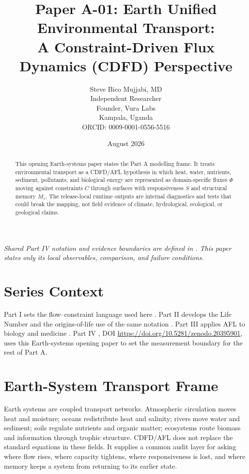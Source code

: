 \documentclass[12pt,a4paper]{article}
\title{\textbf{Paper A-01: Earth Unified Environmental Transport:\\ A Constraint-Driven Flux Dynamics (CDFD) Perspective}}
\author{Steve Bico Mujjabi, MD\\
\small Independent Researcher\\
\small Founder, Vura Labs\\
\small Kampala, Uganda\\
\small ORCID: 0009-0001-0556-5516}
\date{August 2026}
\begin{document}
\maketitle

\noindent\textit{Shared Part IV notation and evidence boundaries are defined in . This paper states only its local observables, comparison, and failure conditions.}

\begin{abstract}
This opening Earth-systems paper states the Part A modelling frame. It treats
environmental transport as a CDFD/AFL hypothesis in which heat, water,
nutrients, sediment, pollutants, and biological energy are represented as
domain-specific fluxes $\Phi$ moving against constraints $C$ through surfaces
with responsiveness $S$ and structural memory $M_s$. The release-local runtime
outputs are internal diagnostics and tests that could break the mapping, not field evidence
of climate, hydrological, ecological, or geological claims.
\end{abstract}

\section{Series Context}

Part I sets the flow--constraint language used here \cite{MujjabiPartI2026}.
Part II develops the Life Number and the origins-of-life use of the same notation
\cite{MujjabiPartII2026}. Part III applies AFL to biology and medicine
\cite{MujjabiPartIII2026}. Part IV \cite{MujjabiPartIV2026}, DOI \url{https://doi.org/10.5281/zenodo.20395901}, uses this Earth-systems opening paper to set
the measurement boundary for the rest of Part A.

\section{Earth-System Transport Frame}

Earth systems are coupled transport networks. Atmospheric circulation moves
heat and moisture; oceans redistribute heat and salinity; rivers move water and
sediment; soils regulate nutrients and organic matter; ecosystems route biomass
and information through trophic structure. CDFD/AFL does not replace the
standard equations in these fields. It supplies a common audit layer for asking
where flow rises, where capacity tightens, where responsiveness is lost, and
where memory keeps a system from returning to its earlier state.
\end{document}
